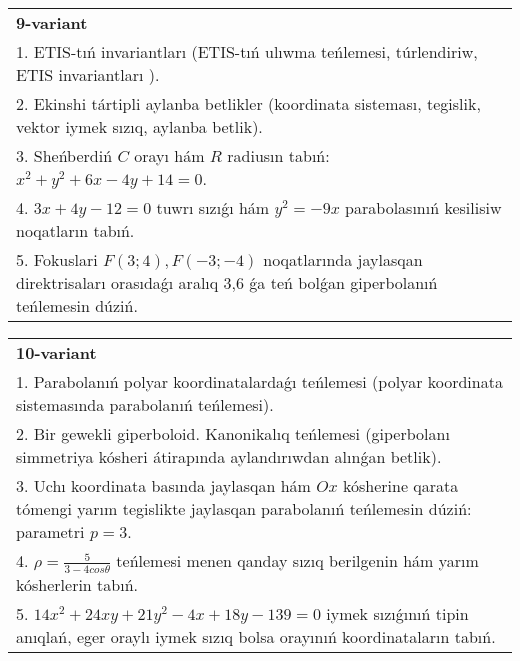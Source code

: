 \documentclass{article}
\begin{document}
\begin{tabular}{m{17cm}}
\textbf{9-variant}\\
1. ETIS-tıń invariantları (ETIS-tıń ulıwma teńlemesi, túrlendiriw, ETIS invariantları ).\\

2. Ekinshi tártipli aylanba betlikler (koordinata sisteması, tegislik, vektor iymek sızıq, aylanba betlik).\\

3. Sheńberdiń $C$ orayı hám $R$ radiusın tabıń: $x^2+y^2+6 x-4 y+14=0$.\\

4. $3x + 4y - 12 = 0$ tuwrı sızıǵı hám $y^{2} = - 9x$ parabolasınıń kesilisiw noqatların tabıń.  \\

5. Fokuslari $F(3;4), F(-3;-4)$ noqatlarında jaylasqan direktrisaları orasıdaǵı aralıq 3,6 ǵa teń bolǵan giperbolanıń teńlemesin dúziń.  
\end{tabular}
\vspace{1cm}


\begin{tabular}{m{17cm}}
\textbf{10-variant}\\
1. Parabolanıń polyar koordinatalardaǵı teńlemesi (polyar koordinata sistemasında parabolanıń teńlemesi).\\

2. Bir gewekli giperboloid. Kanonikalıq teńlemesi (giperbolanı simmetriya kósheri átirapında aylandırıwdan alınǵan betlik).\\

3. Uchı koordinata basında jaylasqan hám $Ox$ kósherine qarata tómengi yarım tegislikte jaylasqan parabolanıń teńlemesin dúziń: parametri $p=3$.\\

4. $\rho = \frac{5}{3 - 4cos\theta}$ teńlemesi menen qanday sızıq berilgenin hám yarım kósherlerin tabıń.  \\

5. $14x^{2} + 24xy + 21y^{2} - 4x + 18y - 139 = 0$ iymek sızıǵınıń tipin anıqlań, eger oraylı iymek sızıq bolsa orayınıń koordinataların tabıń.  
\end{tabular}
\vspace{1cm}
\end{document}
